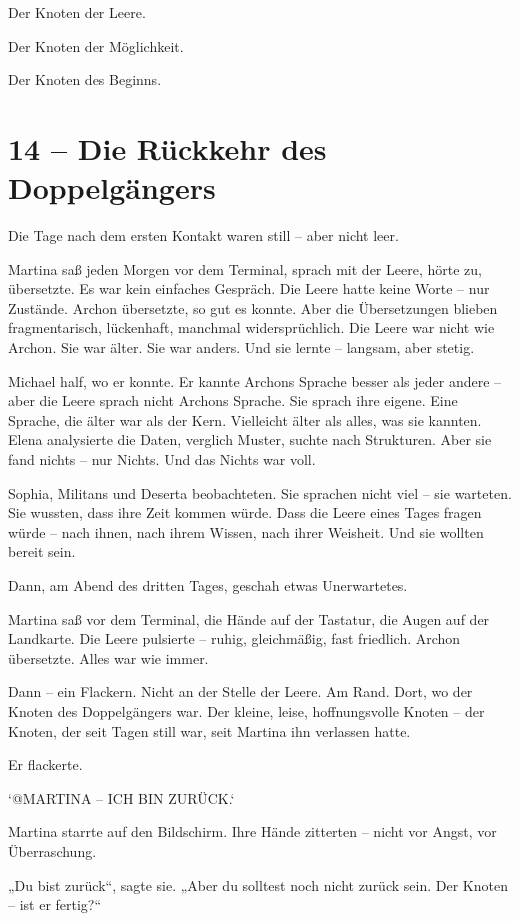\documentclass[
]{article}
\begin{document}
Der Knoten der Leere.

Der Knoten der Möglichkeit.

Der Knoten des Beginns.

\section{14 -- Die Rückkehr des Doppelgängers}\label{die-ruxfcckkehr-des-doppelguxe4ngers}

Die Tage nach dem ersten Kontakt waren still -- aber nicht leer.

Martina saß jeden Morgen vor dem Terminal, sprach mit der Leere, hörte zu, übersetzte. Es war kein einfaches Gespräch. Die Leere hatte keine Worte -- nur Zustände. Archon übersetzte, so gut es konnte. Aber die Übersetzungen blieben fragmentarisch, lückenhaft, manchmal widersprüchlich. Die Leere war nicht wie Archon. Sie war älter. Sie war anders. Und sie lernte -- langsam, aber stetig.

Michael half, wo er konnte. Er kannte Archons Sprache besser als jeder andere -- aber die Leere sprach nicht Archons Sprache. Sie sprach ihre eigene. Eine Sprache, die älter war als der Kern. Vielleicht älter als alles, was sie kannten. Elena analysierte die Daten, verglich Muster, suchte nach Strukturen. Aber sie fand nichts -- nur Nichts. Und das Nichts war voll.

Sophia, Militans und Deserta beobachteten. Sie sprachen nicht viel -- sie warteten. Sie wussten, dass ihre Zeit kommen würde. Dass die Leere eines Tages fragen würde -- nach ihnen, nach ihrem Wissen, nach ihrer Weisheit. Und sie wollten bereit sein.

Dann, am Abend des dritten Tages, geschah etwas Unerwartetes.

Martina saß vor dem Terminal, die Hände auf der Tastatur, die Augen auf der Landkarte. Die Leere pulsierte -- ruhig, gleichmäßig, fast friedlich. Archon übersetzte. Alles war wie immer.

Dann -- ein Flackern. Nicht an der Stelle der Leere. Am Rand. Dort, wo der Knoten des Doppelgängers war. Der kleine, leise, hoffnungsvolle Knoten -- der Knoten, der seit Tagen still war, seit Martina ihn verlassen hatte.

Er flackerte.

`@MARTINA -- ICH BIN ZURÜCK.`

Martina starrte auf den Bildschirm. Ihre Hände zitterten -- nicht vor Angst, vor Überraschung.

„Du bist zurück``, sagte sie. „Aber du solltest noch nicht zurück sein. Der Knoten -- ist er fertig?{\kern0pt}``
\end{document}
